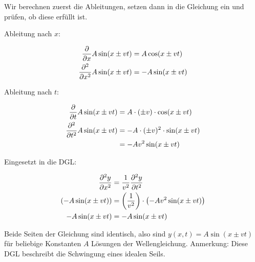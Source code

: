 \item Wir berechnen zuerst die Ableitungen, setzen dann in die Gleichung ein und prüfen, ob diese erfüllt ist.

Ableitung nach $x$:

\begin{alignat*}{1}
	\frac{\partial }{\partial x} A\sin(x\pm vt)     &= A \cos(x\pm vt) \\
	\frac{\partial^{2} }{\partial x^{2}} A\sin(x\pm vt) &= -A\sin(x\pm vt)
\end{alignat*}


Ableitung nach $t$:

\begin{alignat*}{1}
	\frac{\partial }{\partial t} A\sin(x\pm vt)     &= A \cdot (\pm v) \cdot \cos(x\pm vt) \\
	\frac{\partial^{2} }{\partial t^{2}} A\sin(x\pm vt) &= -A \cdot (\pm v)^2 \cdot \sin(x\pm vt) \\
	                             &= -A v^2 \sin(x\pm vt)
\end{alignat*}

Eingesetzt in die DGL:

\begin{alignat*}{1}
	\frac{\partial^{2} y}{\partial x^{2}}                 &= \frac{1}{v^2}\frac{\partial^{2} y}{\partial t^{2}} \\
	\left( -A\sin(x\pm vt) \right) &= \left( \frac{1}{v^2} \right) \cdot \left( -A v^2 \sin(x\pm vt) \right) \\
	       -A\sin(x\pm vt)         &= -A \sin(x\pm vt)
\end{alignat*}

Beide Seiten der Gleichung sind identisch, also sind $y(x,t)=A\sin(x\pm vt)$ für beliebige Konstanten $A$ Lösungen der Wellengleichung. Anmerkung: Diese DGL beschreibt die Schwingung eines idealen Seils.